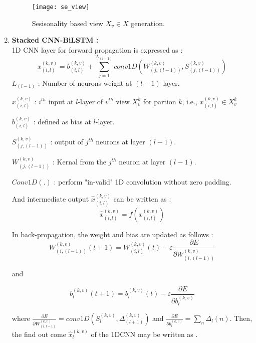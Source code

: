 \begin{enumerate}[label=(\alph*)]
 \begin{figure}\label{view gen}
  \centering
  \texttt{[image: se\_view]}
  \caption{Sesisonality based view $X_v \in X$ generation.}
 \end{figure}


\item \textbf{Stacked CNN-BiLSTM : } \\
1D CNN layer for forward propagation is expressed as  : 
\begin{equation} \label{1dcnn}
  x_{(i, l)}^{(k, v)}=b_{(i, l)}^{(k, v)} + \sum_{j=1}^{L_{(l-1)}} conv1D \left(W_{(j, (l-1))}^{(k, v)},  S_{(j, (l-1))}^{(k, v)} \right)
\end{equation}
$L_{(l-1)}$ :  Number of neurons weight at $(l-1)$ layer.

$x_{(i, l)}^{(k, v)}$ :  $i^{th}$ input at $l$-layer of $v^{th}$ view $X_v^k$ for partion  $k$,  i.e.,  $x_{(i, l)}^{(k, v)} \in X_v^k$

$b_{(i, l)}^{(k, v)}$ :  defined as bias at $l$-layer.

$S_{(j, (l-1))}^{(k, v)}$ :  output of $j^{th}$ neurons at layer $(l-1)$.

$W_{(j, (l-1))}^{(k, v)}$ :  Kernal from the $j^{th}$ neuron at layer $(l-1)$.

$Conv1D (.)$ :  perform "in-valid" 1D convolution without zero padding.

And intermediate output $\hat{x}_{(i, l)}^{(k, v)}$ can be written as \Cref{1dd} :  
\begin{equation} \label{1dd}
  \hat{x}_{(i, l)}^{(k, v)}= f\left( x_{(i, l)}^{(k, v)} \right)
\end{equation}

In back-propagation,  the weight and bias are updated as follows : 
\begin{equation} \label{backp}
  W_{(i, (l-1))}^{(k, v)} (t+1) =W_{(i, l)}^{(k, v)}(t)- \varepsilon \frac{\partial E}{\partial W_{(i, (l-1))}^{(k, v)}}
\end{equation}

and 

\begin{equation} \label{bias}
  b_l^{(k, v)} (t+1) = b_l^{(k, v)}(t)- \varepsilon \frac{\partial E}{\partial b_l^{(k, v)}}
\end{equation}

where $\frac{\partial E}{\partial W_{(i, l-1)}^{(k, v)}} =conv1D \left(S_l^{(k, v)},  \Delta_{(l+1)}^{(k, v)} \right)$ and $\frac{\partial E}{\partial b_l^{(k, v)} }=\sum_{n}^{}\Delta_{l} (n)$. 
Then,  the find out come $\hat{x}_l^{(k, v)}$ of the 1DCNN may be written as .


\end{enumerate}
